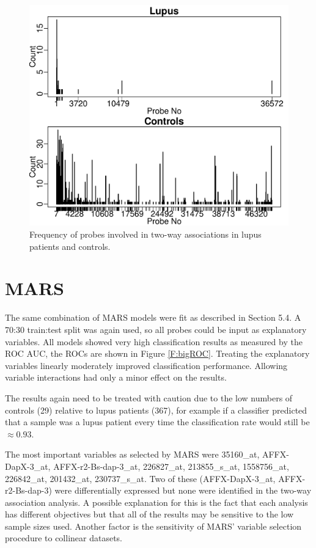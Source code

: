 \documentclass[a4paper, 12pt]{report}
\begin{document}
\begin{figure}[H]
\begin{centering}
\includegraphics[width=12cm]{bigFilterSafe.pdf}
\caption{Frequency of probes involved in two-way associations in lupus patients and controls.} 
\label{F:bigFilter}
\end{centering}
\end{figure}

\section{MARS}
The same combination of MARS models were fit as described in Section 5.4. A 70:30 train:test split was again used, so all probes could be input as explanatory variables. All models showed very high classification results as measured by the ROC AUC, the ROCs are shown in Figure \ref{F:bigROC}. Treating the explanatory variables linearly moderately improved classification performance. Allowing variable interactions had only a minor effect on the results.

The results again need to be treated with caution due to the low numbers of controls (29) relative to lupus patients (367), for example if a classifier predicted that a sample was a lupus patient every time the classification rate would still be $\approx 0.93$. 

The most important variables as selected by MARS were 35160\_at, AFFX-DapX-3\_at, AFFX-r2-Bs-dap-3\_at, 226827\_at, 213855\_s\_at, 1558756\_at, 226842\_at, 201432\_at, 230737\_s\_at. Two of these (AFFX-DapX-3\_at, AFFX-r2-Bs-dap-3) were differentially expressed but none were identified in the two-way association analysis. A possible explanation for this is the fact that each analysis has different objectives but that all of the results may be sensitive to the low sample sizes used. Another factor is the sensitivity of MARS' variable selection procedure to collinear datasets.
\end{document}
